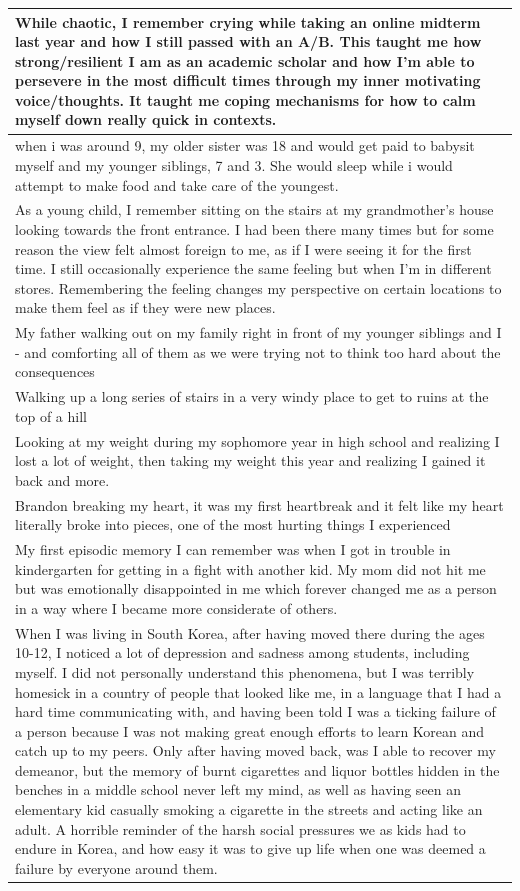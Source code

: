\documentclass[
  .7em,
  letterpaper,
  DIV=11,
  numbers=noendperiod]{scrartcl}
\begin{document}
\begin{table}
\begin{tabular}{l}
\hline
While chaotic, I remember crying while taking an online midterm last year and how I still passed with an A/B. This taught me how strong/resilient I am as an academic scholar and how I'm able to persevere in the most difficult times through my inner motivating voice/thoughts. It taught me coping mechanisms for how to calm myself down really quick in contexts.\\
\hline
when i was around 9, my older sister was 18 and would get paid to babysit myself and my younger siblings, 7 and 3. She would sleep while i would attempt to make food and take care of the youngest.\\
\hline
As a young child, I remember sitting on the stairs at my grandmother's house looking towards the front entrance. I had been there many times but for some reason the view felt almost foreign to me, as if I were seeing it for the first time. I still occasionally experience the same feeling but when I'm in different stores. Remembering the feeling changes my perspective on certain locations to make them feel as if they were new places.\\
\hline
My father walking out on my family right in front of my younger siblings and I - and comforting all of them as we were trying not to think too hard about the consequences\\
\hline
Walking up a long series of stairs in a very windy place to get to ruins at the top of a hill\\
\hline
Looking at my weight during my sophomore year in high school and realizing I lost a lot of weight, then taking my weight this year and realizing I gained it back and more.\\
\hline
Brandon breaking my heart, it was my first heartbreak and it felt like my heart literally broke into pieces, one of the most hurting things I experienced\\
\hline
My first episodic memory I can remember was when I got in trouble in kindergarten for getting in a fight with another kid. My mom did not hit me but was emotionally disappointed in me which forever changed me as a person in a way where I became more considerate of others.\\
\hline
When I was living in South Korea, after having moved there during the ages 10-12, I noticed a lot of depression and sadness among students, including myself. I did not personally understand this phenomena, but I was terribly homesick in a country of people that looked like me, in a language that I had a hard time communicating with, and having been told I was a ticking failure of a person because I was not making great enough efforts to learn Korean and catch up to my peers. Only after having moved back, was I able to recover my demeanor, but the memory of burnt cigarettes and liquor bottles hidden in the benches in a middle school never left my mind, as well as having seen an elementary kid casually smoking a cigarette in the streets and acting like an adult. A horrible reminder of the harsh social pressures we as kids had to endure in Korea, and how easy it was to give up life when one was deemed a failure by everyone around them.\\

\end{tabular}
\end{table}
\end{document}
